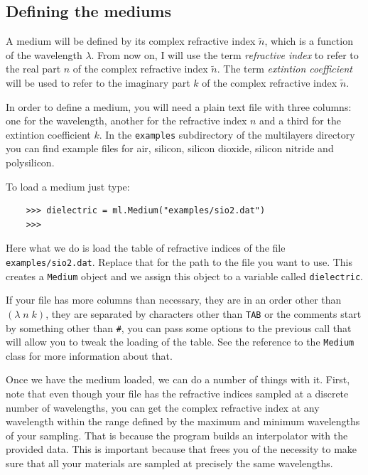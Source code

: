 \documentclass[a4paper,11pt,aps,final]{revtex4}
\begin{document}
\subsection{Defining the mediums}

A medium will be defined by its complex refractive index $\tilde n$, which is a function of the wavelength $\lambda$. From now on, I will use the term \emph{refractive index} to refer to the real part $n$ of the complex refractive index $\tilde n$. The term \emph{extintion coefficient} will be used to refer to the imaginary part $k$ of the complex refractive index $\tilde n$.

In order to define a medium, you will need a plain text file with three columns: one for the wavelength, another for the refractive index $n$ and a third for the extintion coefficient $k$. In the \texttt{examples} subdirectory of the \textsf{multilayers} directory you can find example files for air, silicon, silicon dioxide, silicon nitride and polysilicon.

To load a medium just type:

\begin{verbatim}
    >>> dielectric = ml.Medium("examples/sio2.dat")
    >>>
\end{verbatim}

Here what we do is load the table of refractive indices of the file \texttt{examples/sio2.dat}. Replace that for the path to the file you want to use. This creates a \texttt{Medium} object and we assign this object to a variable called \texttt{dielectric}.

If your file has more columns than necessary, they are in an order other than $(\lambda\;n\;k)$, they are separated by characters other than \texttt{TAB} or the comments start by something other than \texttt{\#}, you can pass some options to the previous call that will allow you to tweak the loading of the table. See the reference to the \texttt{Medium} class for more information about that.

Once we have the medium loaded, we can do a number of things with it. First, note that even though your file has the refractive indices sampled at a discrete number of wavelengths, you can get the complex refractive index at any wavelength within the range defined by the maximum and minimum wavelengths of your sampling. That is because the program builds an interpolator with the provided data. This is important because that frees you of the necessity to make sure that all your materials are sampled at precisely the same wavelengths.
\end{document}
